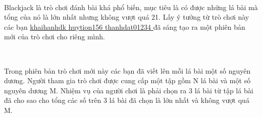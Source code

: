  

Blackjack là trò chơi đánh bài khá phổ biến, mục tiêu là có được những lá bài mà tổng của nó là lớn nhất nhưng không vượt quá 21. Lấy ý tưởng từ trò chơi này các bạn \href{http://vnoi.info/index.php?option=com_voj2&amp;page=user&amp;user=khaihanhdk}{ khaihanhdk }\href{http://vnoi.info/index.php?option=com_voj2&amp;page=user&amp;user=huytion156}{ huytion156 }\href{http://vnoi.info/index.php?option=com_voj2&amp;page=user&amp;user=thanhdat01234}{ thanhdat01234 } đã sáng tạo ra một phiên bản mới của trò chơi cho riêng mình.

 

Trong phiên bản trò chơi mới này các bạn đã viết lên mỗi lá bài một số nguyên dương. Người tham gia trò chơi được cung cấp một tập gồm N lá bài và một số nguyên dương M. Nhiệm vụ của người chơi là phải chọn ra 3 lá bài từ tập lá bài đã cho sao cho tổng các số trên 3 lá bài đã chọn là lớn nhất và không vượt quá M.

 